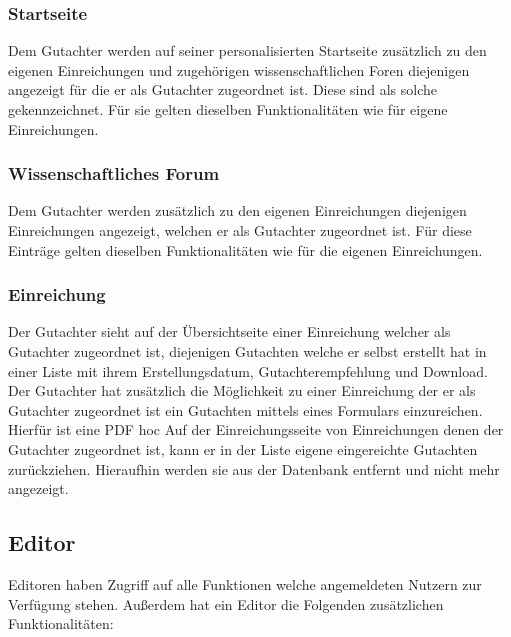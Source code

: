 \subsubsection{Startseite}
\begin{description}
    \XXitem{} Dem Gutachter werden auf seiner personalisierten Startseite zusätzlich zu den eigenen
    Einreichungen und zugehörigen wissenschaftlichen Foren diejenigen angezeigt für die er als Gutachter
    zugeordnet ist. Diese sind als solche gekennzeichnet.%
    Für sie gelten dieselben Funktionalitäten wie für eigene Einreichungen.
\end{description}

\subsubsection{Wissenschaftliches Forum}
\begin{description}
    \XXitem{} Dem Gutachter werden zusätzlich zu den eigenen Einreichungen diejenigen Einreichungen angezeigt,
    welchen er als Gutachter zugeordnet ist. Für diese Einträge gelten dieselben Funktionalitäten wie für die
    eigenen Einreichungen. %
\end{description}

\subsubsection{Einreichung}
\begin{description}
    \XXitem{} Der Gutachter sieht auf der Übersichtseite einer Einreichung welcher als Gutachter
    zugeordnet ist, diejenigen Gutachten welche er selbst erstellt hat in einer
    Liste mit ihrem Erstellungsdatum, Gutachterempfehlung und Download.
    \XXitem{} Der Gutachter hat zusätzlich die Möglichkeit zu einer Einreichung der er als Gutachter zugeordnet ist
    ein Gutachten mittels eines Formulars einzureichen. Hierfür ist eine PDF hoc
     Auf der Einreichungsseite von Einreichungen denen der Gutachter zugeordnet ist,
    kann er in der Liste eigene eingereichte Gutachten zurückziehen. Hieraufhin werden sie aus
    der Datenbank entfernt und nicht mehr angezeigt.
\end{description}

\subsection{Editor}
Editoren haben Zugriff auf alle Funktionen welche angemeldeten Nutzern zur Verfügung stehen.
Außerdem hat ein Editor die Folgenden zusätzlichen Funktionalitäten:

